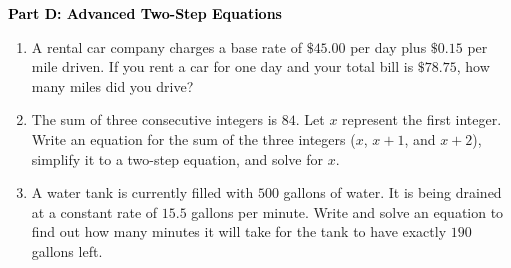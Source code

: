 \documentclass[12pt, letterpaper, fleqn]{article}
\begin{document}
\newpage

\begin{tcolorbox}[colback=customteal!20]
\large\textcolor{black}{\textbf{Part D: Advanced Two-Step Equations}}
\end{tcolorbox}

\vspace{3mm}

\begin{enumerate}[itemsep=5.5cm, leftmargin=0.6cm, resume]
\item A rental car company charges a base rate of $\$45.00$ per day plus $\$0.15$ per mile driven. If you rent a car for one day and your total bill is $\$78.75$, how many miles did you drive?
\item The sum of three consecutive integers is $84$. Let $x$ represent the first integer. Write an equation for the sum of the three integers ($x$, $x+1$, and $x+2$), simplify it to a two-step equation, and solve for $x$.
\item A water tank is currently filled with $500$ gallons of water. It is being drained at a constant rate of $15.5$ gallons per minute. Write and solve an equation to find out how many minutes it will take for the tank to have exactly $190$ gallons left.
\end{enumerate}
\end{document}
